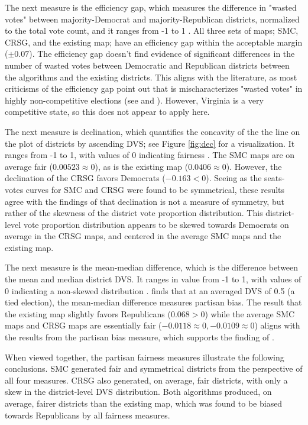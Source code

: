 The next measure is the efficiency gap, which measures the difference in "wasted votes" between majority-Democrat and majority-Republican districts, normalized to the total vote count, and it ranges from -1 to 1 \parencite{stephanopoulos2014}. All three sets of maps; SMC, CRSG, and the existing map; have an efficiency gap within the acceptable margin ($\pm 0.07$). The efficiency gap doesn't find evidence of significant differences in the number of wasted votes between Democratic and Republican districts between the algorithms and the existing districts. This aligns with the literature, as most criticisms of the efficiency gap point out that is mischaracterizes "wasted votes" in highly non-competitive elections (see \textcite{veomett2018} and \textcite{katz2020}). However, Virginia is a very competitive state, so this does not appear to apply here.

The next measure is declination, which quantifies the concavity of the the line on the plot of districts by ascending DVS; see Figure \ref{fig:dec} for a visualization. It ranges from -1 to 1, with values of 0 indicating fairness \parencite{warrington2018}. The SMC maps are on average fair ($0.00523 \approx 0$), as is the existing map ($0.0406 \approx 0$). However, the declination of the CRSG favors Democrats ($-0.163 < 0$). Seeing as the seats-votes curves for SMC and CRSG were found to be symmetrical, these results agree with the findings of \textcite{katz2020} that declination is not a measure of symmetry, but rather of the skewness of the district vote proportion distribution. This district-level vote proportion distribution appears to be skewed towards Democrats on average in the CRSG maps, and centered in the average SMC maps and the existing map. 

The next measure is the mean-median difference, which is the difference between the mean and median district DVS. It ranges in value from -1 to 1, with values of 0 indicating a non-skewed distribution \parencite{mcdonald2015}. \textcite{katz2020} finds that at an averaged DVS of 0.5 (a tied election), the mean-median difference measures partisan bias. The result that the existing map slightly favors Republicans ($0.068 > 0$) while the average SMC maps and CRSG maps are essentially fair ($-0.0118 \approx 0, -0.0109 \approx 0$) aligns with the results from the partisan bias measure, which supports the finding of \textcite{katz2020}. 

When viewed together, the partisan fairness measures illustrate the following conclusions. SMC generated fair and symmetrical districts from the perspective of all four measures. CRSG also generated, on average, fair districts, with only a skew in the district-level DVS distribution. Both algorithms produced, on average, fairer districts than the existing map, which was found to be biased towards Republicans by all fairness measures. 

